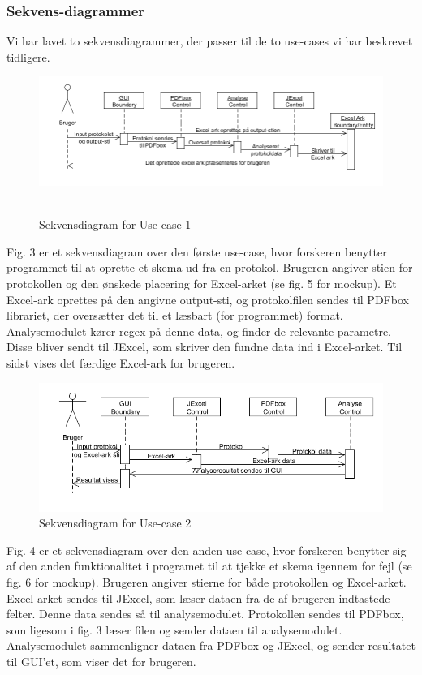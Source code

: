 \documentclass[11pt]{article}
\begin{document}
\subsubsection{Sekvens-diagrammer}
Vi har lavet to sekvensdiagrammer, der passer til de to use-cases vi har beskrevet tidligere.
\begin{figure}[H]
\includegraphics[scale=0.4]{Sekvensdiagram1v2} \hfill \\\\
\caption{Sekvensdiagram for Use-case 1}
\end{figure}
Fig. 3 er et sekvensdiagram over den første use-case, hvor forskeren benytter programmet til at oprette et skema ud fra en protokol. Brugeren angiver stien for protokollen og den ønskede placering for Excel-arket (se fig. 5 for mockup). Et Excel-ark oprettes på den angivne output-sti, og protokolfilen sendes til PDFbox librariet, der oversætter det til et læsbart (for programmet) format. Analysemodulet kører regex på denne data, og finder de relevante parametre. Disse bliver sendt til JExcel, som skriver den fundne data ind i Excel-arket. Til sidst vises det færdige Excel-ark for brugeren.\\
\begin{figure}[H]
\includegraphics[scale=0.4]{Sekvensdiagram2v2}
\caption{Sekvensdiagram for Use-case 2}
\end{figure}
Fig. 4 er et sekvensdiagram over den anden use-case, hvor forskeren benytter sig af den anden funktionalitet i programet til at tjekke et skema igennem for fejl (se fig. 6 for mockup). Brugeren angiver stierne for både protokollen og Excel-arket. Excel-arket sendes til JExcel, som læser dataen fra de af brugeren indtastede felter. Denne data sendes så til analysemodulet. Protokollen sendes til PDFbox, som ligesom i fig. 3 læser filen og sender dataen til analysemodulet. Analysemodulet sammenligner dataen fra PDFbox og JExcel, og sender resultatet til GUI'et, som viser det for brugeren.
\end{document}
